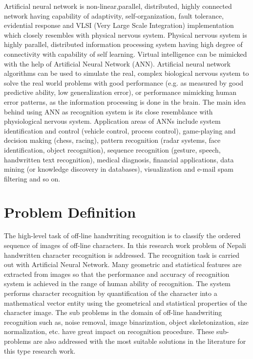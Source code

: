 \documentclass[12pt,a4paper,oneside]{article}
\numberwithin{equation}{section}
\numberwithin{algorithm}{section}
\begin{document}
Artificial neural network is non-linear,parallel, distributed, highly connected network having capability of adaptivity, self-organization, fault tolerance, evidential response and VLSI (Very Large Scale Integration) implementation which closely resembles with physical nervous system. Physical nervous system is highly parallel, distributed information processing system having high degree of connectivity with capability of self learning. Virtual intelligence can be mimicked with the help of Artificial Neural Network (ANN). Artificial neural network algorithms can be used to simulate the real, complex biological nervous system to solve the real world problems with good performance (e.g. as measured by good predictive ability, low generalization error), or performance mimicking human error patterns, as the information processing is done in the brain. The main idea behind using ANN as recognition system is its close resemblance with physiological nervous system. Application areas of ANNs include system identification and control (vehicle control, process control), game-playing and decision making (chess, racing), pattern recognition (radar systems, face identification, object recognition), sequence recognition (gesture, speech, handwritten text recognition), medical diagnosis, financial applications, data mining (or knowledge discovery in databases), visualization and e-mail spam filtering and so on.

\section{Problem Definition}\label{problem_definition}

The high-level task of off-line handwriting recognition is to classify the ordered sequence of images of off-line characters. In this research work problem of Nepali handwritten character recognition is addressed. The recognition task is carried out with Artificial Neural Network. Many geometric and statistical features are extracted from images so that the performance and accuracy of recognition system is achieved in the range of human ability of recognition. The system performs character recognition by quantification of the character into a mathematical vector entity using the geometrical and statistical properties of the character image.  The sub problems in the domain of off-line handwriting recognition such as, noise removal, image binarization, object skeletonization, size normalization, etc. have great impact on recognition procedure. These sub-problems are also addressed with the most suitable solutions in the literature for this type research work.
\end{document}
